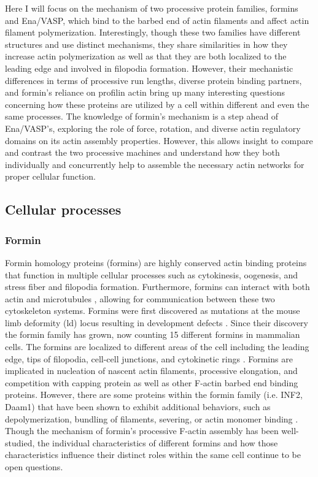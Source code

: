 Here I will focus on the mechanism of two processive protein families, formins and Ena/VASP, which bind to the barbed end of actin filaments and affect actin filament polymerization. Interestingly, though these two families have different structures and use distinct mechanisms, they share similarities in how they increase actin polymerization as well as that they are both localized to the leading edge and involved in filopodia formation. However, their mechanistic differences in terms of processive run lengths, diverse protein binding partners, and formin's reliance on profilin actin bring up many interesting questions concerning how these proteins are utilized by a cell within different and even the same processes. The knowledge of formin's mechanism is a step ahead of Ena/VASP's, exploring the role of force, rotation, and diverse actin regulatory domains on its actin assembly properties. However, this allows insight to compare and contrast the two processive machines and understand how they both individually and concurrently help to assemble the necessary actin networks for proper cellular function. 

\subsection{Cellular processes}\label{ena-formin-cellular-processes}\label{comparison-cellular}

\subsubsection{Formin}

Formin homology proteins (formins) are highly conserved actin binding proteins that function in multiple cellular processes such as cytokinesis, oogenesis, and stress fiber and filopodia formation. Furthermore, formins can interact with both actin and microtubules \citep{bartolini_formin_2008,henty-ridilla_accelerated_2016}, allowing for communication between these two cytoskeleton systems. Formins were first discovered as mutations at the mouse limb deformity (ld) locus resulting in development defects \citep{woychik_formins:_1990}. Since their discovery the formin family has grown, now counting 15 different formins in mammalian cells. The formins are localized to different areas of the cell including the leading edge, tips of filopodia, cell-cell junctions, and cytokinetic rings \citep{pollard_actin_2016}. Formins are implicated in nucleation of nascent actin filaments, processive elongation, and competition with capping protein as well as other F-actin barbed end binding proteins. However, there are some proteins within the formin family (i.e. INF2, Daam1) that have been shown to exhibit additional behaviors, such as depolymerization, bundling of filaments, severing, or actin monomer binding \citep{gurel_assembly_2015}. Though the mechanism of formin's processive F-actin assembly has been well-studied, the individual characteristics of different formins and how those characteristics influence their distinct roles within the same cell continue to be open questions. 

